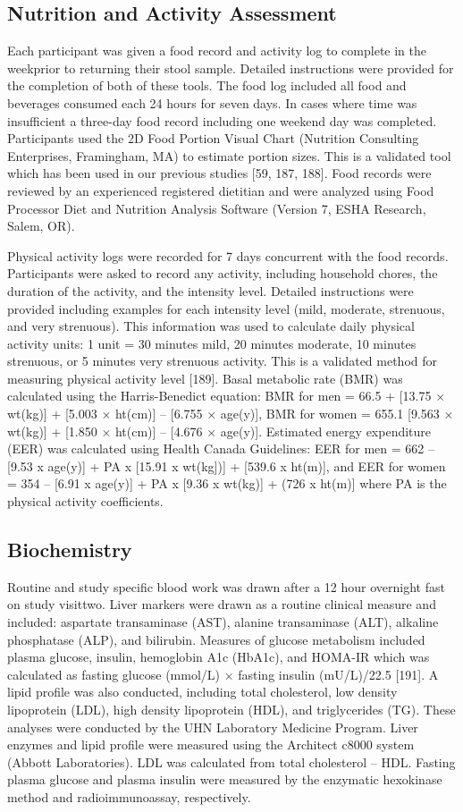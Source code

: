 \subsection{Nutrition and Activity Assessment}
Each participant was given a food record and activity log to complete in the weekprior to returning their stool sample. Detailed instructions were provided for the completion of both of these tools. The food log included all food and beverages consumed each 24 hours for seven days. In cases where time was insufficient a three-day food record including one weekend day was completed.  Participants used the 2D Food Portion Visual Chart (Nutrition Consulting Enterprises, Framingham, MA) to estimate portion sizes. This is a validated tool which has been used in our previous studies [59, 187, 188]. Food records were reviewed by an experienced registered dietitian and were analyzed using Food Processor Diet and Nutrition Analysis Software (Version 7, ESHA Research, Salem, OR).

Physical activity logs were recorded for 7 days concurrent with the food records. Participants were asked to record any activity, including household chores, the duration of the activity, and the intensity level. Detailed instructions were provided including examples for each intensity level (mild, moderate, strenuous, and very strenuous).  This information was used to calculate daily physical activity units: 1 unit = 30 minutes mild, 20 minutes moderate, 10 minutes strenuous, or 5 minutes very strenuous activity. This is a validated method for measuring physical activity level [189]. Basal metabolic rate (BMR) was calculated using the Harris-Benedict equation: BMR for men = 66.5 + [13.75 × wt(kg)] + [5.003 × ht(cm)] – [6.755 × age(y)], BMR for women = 655.1 [9.563  × wt(kg)] + [1.850  × ht(cm)] – [4.676  × age(y)]. Estimated energy expenditure (EER) was calculated using Health Canada Guidelines: EER for men = 662 – [9.53 x age(y)] + PA x {[15.91 x wt(kg])] + [539.6 x ht(m)]}, and EER for women = 354 – [6.91 x age(y)] + PA x {[9.36 x wt(kg)] + (726 x ht(m)]} where PA is the physical activity coefficients.

\subsection{Biochemistry}
Routine and study specific blood work was drawn after a 12 hour overnight fast on study visittwo. Liver markers were drawn as a routine clinical measure and included: aspartate transaminase (AST), alanine transaminase (ALT), alkaline phosphatase (ALP), and bilirubin. Measures of glucose metabolism included plasma glucose, insulin, hemoglobin A1c (HbA1c), and HOMA-IR which was calculated as fasting glucose (mmol/L) × fasting insulin (mU/L)/22.5 [191]. A lipid profile was also conducted, including total cholesterol, low density lipoprotein (LDL), high density lipoprotein (HDL), and triglycerides (TG). These analyses were conducted by the UHN Laboratory Medicine Program. Liver enzymes and lipid profile were measured using the Architect c8000 system (Abbott Laboratories). LDL was calculated from total cholesterol – HDL. Fasting plasma glucose and plasma insulin were measured by the enzymatic hexokinase method and radioimmunoassay, respectively.

